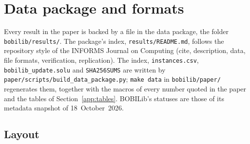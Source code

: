 \section{Data package and formats}\label{app:data}

Every result in the paper is backed by a file in the data package, the
folder \texttt{bobilib/results/}. The package's index,
\texttt{results/README.md}, follows the repository style of the INFORMS
Journal on Computing (cite, description, data, file formats, verification,
replication). The index, \texttt{instances.csv},
\texttt{bobilib\_update.solu} and \texttt{SHA256SUMS} are written by
\texttt{paper/scripts/build\_data\_package.py}; \texttt{make data} in
\texttt{bobilib/paper/} regenerates them, together with the macros of every
number quoted in the paper and the tables of Section~\ref{app:tables}. BOBILib's
statuses are those of its metadata snapshot of 18~October~2026.

\subsection{Layout}


